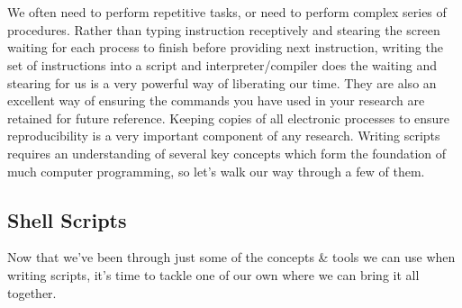 
\chapter{\moduleTitle}
\newpage

We often need to perform repetitive tasks, or need to perform complex series of procedures. Rather
than typing instruction receptively and stearing the screen waiting for each process to finish
before providing next instruction, writing the set of instructions into a script and interpreter/compiler 
does the waiting and stearing for us is a very powerful way of
liberating our time. They are also an excellent way of ensuring the commands you have used in your
research are retained for future reference.
Keeping copies of all electronic processes to ensure reproducibility is a very important component
of any research. 
Writing scripts requires an understanding of several key concepts which form the foundation of much
computer programming, so let's walk our way through a few of them. \\


\section{Shell Scripts}
Now that we've been through just some of the concepts \& tools we can use when writing scripts, it's
time to tackle one of our own where we can bring it all together.

